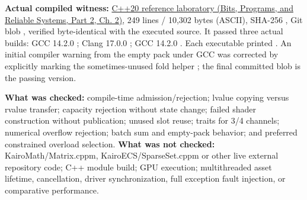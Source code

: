 \textbf{Actual compiled witness:} \href{../01-Bits-Programs-and-Reliable-Systems-P02/main.pdf\#nameddest=source-file-a5db53514d74ae247b4ac42f}{C++20 reference laboratory (Bits, Programs, and Reliable Systems, Part 2, Ch. 2)}, 249 lines / 10,302 bytes (ASCII), SHA-256 , Git blob , verified byte-identical with the executed source. It passed three actual builds: GCC 14.2.0 ; Clang 17.0.0 ; GCC 14.2.0 . Each executable printed . An initial compiler warning from the empty pack under GCC  was corrected by explicitly marking the sometimes-unused fold helper ; the final committed blob is the passing version.

\textbf{What was checked:} compile-time admission/rejection; lvalue copying versus rvalue transfer; capacity rejection without state change; failed shader construction without publication; unused slot reuse; traits for 3/4 channels; numerical overflow rejection; batch sum and empty-pack behavior; and preferred constrained overload selection. \textbf{What was not checked:} KairoMath/Matrix.cppm, KairoECS/SparseSet.cppm or other live external repository code; C++ module build; GPU execution; multithreaded asset lifetime, cancellation, driver synchronization, full exception fault injection, or comparative performance.

